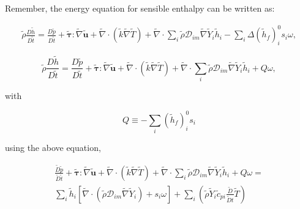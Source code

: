 \documentclass[preprint,12pt,authoryear]{elsarticle}
\begin{document}
Remember, the energy equation for sensible enthalpy %
can be written  as:

\begin{equation}
\begin{split}
        \tilde{\rho}\frac{D  \tilde{h}}{D\tilde{t}}
=
        \frac{D \tilde{p}}{D\tilde{t}}
+       
        \pmb{\tilde{\tau}}:\tilde{\nabla} \tilde{\mathbf{u}} 
+ 
        \tilde{\nabla} \cdot (\tilde{k}\tilde{\nabla} \tilde{T})
+
        \tilde{\nabla} \cdot
        \sum\limits_i 
        \tilde{\rho}\mathcal{D}_{im}\tilde{\nabla}\tilde{Y}_i     
        \tilde{h}_i
        -
	\sum_i \Delta(\tilde{h}_f)_i^0 s_i \omega,
\end{split}
\end{equation}

\begin{equation}
       \tilde{\rho}\frac{D  \tilde{h}}{D\tilde{t}}
=
        \frac{D \tilde{p}}{D\tilde{t}}
+       
        \pmb{\tilde{\tau}}:\tilde{\nabla} \tilde{\mathbf{u}} 
+ 
        \tilde{\nabla} \cdot (\tilde{k}\tilde{\nabla} \tilde{T})
+
        \tilde{\nabla} \cdot
        \sum\limits_i 
        \tilde{\rho}\mathcal{D}_{im}\tilde{\nabla}\tilde{Y}_i     
        \tilde{h}_i
        +
        Q\omega,
\end{equation}

with

\[
   Q \equiv -\sum_i (\tilde{h}_f)_i^0  s_i 
\]

using the above equation, 

\begin{equation}
\begin{split}
        \frac{\tilde{D} \tilde{p}}{\tilde{D}\tilde{t}}
        +       
        \pmb{\tilde{\tau}}:\tilde{\nabla} \tilde{\mathbf{u}} 
        + 
        \tilde{\nabla} \cdot (\tilde{k}\tilde{\nabla} \tilde{T})
        +
        \tilde{\nabla} \cdot
        \sum\limits_i 
        \tilde{\rho}\mathcal{D}_{im}\tilde{\nabla}\tilde{Y}_i     
        \tilde{h}_i
        +
	Q\omega
        =
	\\
        \sum\limits_i
                \tilde{h}_i
                [
                	\tilde{\nabla}\cdot
			(
			\tilde{\rho}\mathcal{D}_{im}\tilde{\nabla}\tilde{Y}_i
			)
			+
        	s_i \omega
		]
        +
        \sum\limits_i
        \left(
                \tilde{\rho}
                \tilde{Y}_i
                \tilde{c}_{pi}
                \frac{\tilde{D}}{\tilde{D} t}
                \tilde{T}
        \right)
\end{split}
\end{equation}
\end{document}
